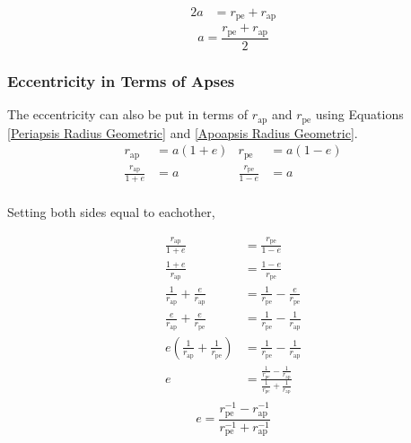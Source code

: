 \documentclass{article}
\begin{document}
\begin{align*}
    2a & = r_\text{pe}+r_\text{ap}
\end{align*}
\begin{equation}\label{SMA in terms of apses}
    a = \frac{r_\text{pe}+r_\text{ap}}{2}
\end{equation}

\subsubsection{Eccentricity in Terms of Apses}

The eccentricity can also be put in terms of $r_\text{ap}$ and $r_\text{pe}$ using Equations \eqref{Periapsis Radius Geometric} and \eqref{Apoapsis Radius Geometric}.
\begin{align*}
    r_\text{ap}             & =a(1+e) & r_\text{pe}             & =a(1-e) \\
    \frac{r_\text{ap}}{1+e} & =a      & \frac{r_\text{pe}}{1-e} & =a      \\
\end{align*}

Setting both sides equal to eachother,

\begin{align*}
    \frac{r_\text{ap}}{1+e}                                   & =\frac{r_\text{pe}}{1-e}                                                                         \\
    \frac{1+e}{r_\text{ap}}                                   & =\frac{1-e}{r_\text{pe}}                                                                         \\
    \frac{1}{r_\text{ap}}+\frac{e}{r_\text{ap}}               & =\frac{1}{r_\text{pe}}-\frac{e}{r_\text{pe}}                                                     \\
    \frac{e}{r_\text{ap}}+\frac{e}{r_\text{pe}}               & =\frac{1}{r_\text{pe}}-\frac{1}{r_\text{ap}}                                                     \\
    e\left(\frac{1}{r_\text{ap}}+\frac{1}{r_\text{pe}}\right) & =\frac{1}{r_\text{pe}}-\frac{1}{r_\text{ap}}                                                     \\
    e                                                         & =\frac{\frac{1}{r_\text{pe}}-\frac{1}{r_\text{ap}}}{\frac{1}{r_\text{pe}}+\frac{1}{r_\text{ap}}} \\
\end{align*}
\begin{equation}\label{Accentricity in terms of apses}
    e=\frac{r_\text{pe}^{-1}-r_\text{ap}^{-1}}{r_\text{pe}^{-1}+r_\text{ap}^{-1}}
\end{equation}
\end{document}
